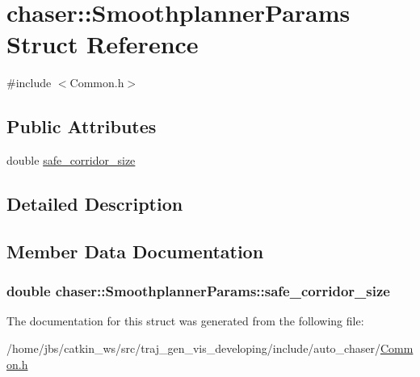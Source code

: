 \hypertarget{structchaser_1_1_smoothplanner_params}{}\section{chaser\+:\+:Smoothplanner\+Params Struct Reference}
\label{structchaser_1_1_smoothplanner_params}


{\ttfamily \#include $<$Common.\+h$>$}

\subsection*{Public Attributes}
\begin{DoxyCompactItemize}
\item 
double \hyperlink{structchaser_1_1_smoothplanner_params_a9f04e119fe2f90c33a0bd94702b5950a}{safe\+\_\+corridor\+\_\+size}
\end{DoxyCompactItemize}


\subsection{Detailed Description}


\subsection{Member Data Documentation}
\subsubsection[{\texorpdfstring{safe\+\_\+corridor\+\_\+size}{safe_corridor_size}}]{\setlength{\rightskip}{0pt plus 5cm}double chaser\+::\+Smoothplanner\+Params\+::safe\+\_\+corridor\+\_\+size}\hypertarget{structchaser_1_1_smoothplanner_params_a9f04e119fe2f90c33a0bd94702b5950a}{}\label{structchaser_1_1_smoothplanner_params_a9f04e119fe2f90c33a0bd94702b5950a}


The documentation for this struct was generated from the following file\+:\begin{DoxyCompactItemize}
\item 
/home/jbs/catkin\+\_\+ws/src/traj\+\_\+gen\+\_\+vis\+\_\+developing/include/auto\+\_\+chaser/\hyperlink{_common_8h}{Common.\+h}\end{DoxyCompactItemize}
